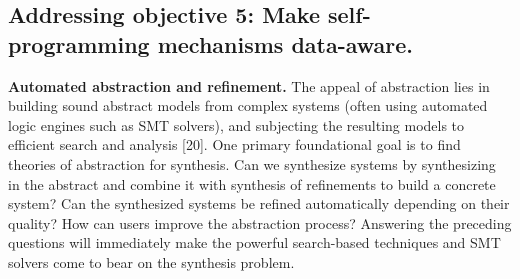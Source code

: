 








\subsection{Addressing objective 5: Make self-programming mechanisms data-aware.}

\textbf{Automated abstraction and refinement.} The appeal of abstraction lies in building sound abstract models from complex systems (often using automated logic engines such as SMT solvers), and subjecting the resulting models to efficient search and analysis [20]. One primary foundational goal is to find theories of abstraction for synthesis. Can we synthesize systems by synthesizing in the abstract and combine it with synthesis of refinements to build a concrete system? Can the synthesized systems be refined automatically depending on their quality? How can users improve the abstraction process? Answering the preceding questions will immediately make the powerful search-based techniques and SMT solvers come to bear on the synthesis problem.


